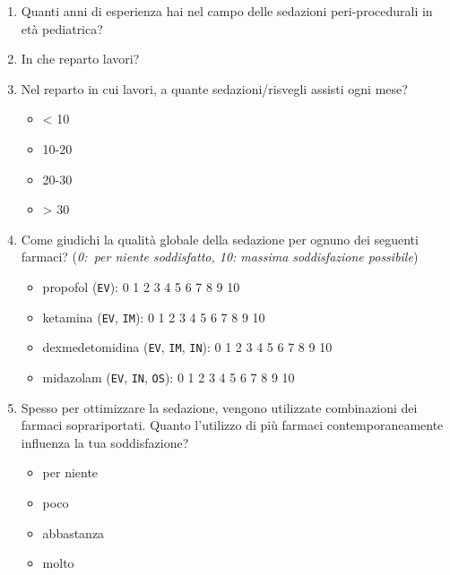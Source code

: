 \begin{enumerate}
           \item Quanti anni di esperienza hai nel campo delle sedazioni peri-procedurali in età pediatrica?
           
           \item In che reparto lavori?
           
           \item Nel reparto in cui lavori, a quante sedazioni/risvegli assisti ogni mese?
           \begin{itemize}
               \item < 10
               \item 10-20
               \item 20-30
               \item > 30
           \end{itemize}
           
           \item Come giudichi la qualità globale della sedazione per ognuno dei seguenti farmaci? (\emph{0:~per niente soddisfatto, 10: massima soddisfazione possibile})
           \begin{itemize}
               \item propofol (\texttt{EV}): 0 1 2 3 4 5 6 7 8 9 10
               \item ketamina (\texttt{EV}, \texttt{IM}): 0 1 2 3 4 5 6 7 8 9 10
               \item dexmedetomidina (\texttt{EV}, \texttt{IM}, \texttt{IN}): 0 1 2 3 4 5 6 7 8 9 10
               \item midazolam (\texttt{EV}, \texttt{IN}, \texttt{OS}): 0 1 2 3 4 5 6 7 8 9 10
           \end{itemize}
           
           \item Spesso per ottimizzare la sedazione, vengono utilizzate combinazioni dei farmaci soprariportati. Quanto l'utilizzo di più farmaci contemporaneamente influenza la tua soddisfazione?
           \begin{itemize}
               \item per niente
               \item poco
               \item abbastanza
               \item molto
           \end{itemize}
           

\end{enumerate}
